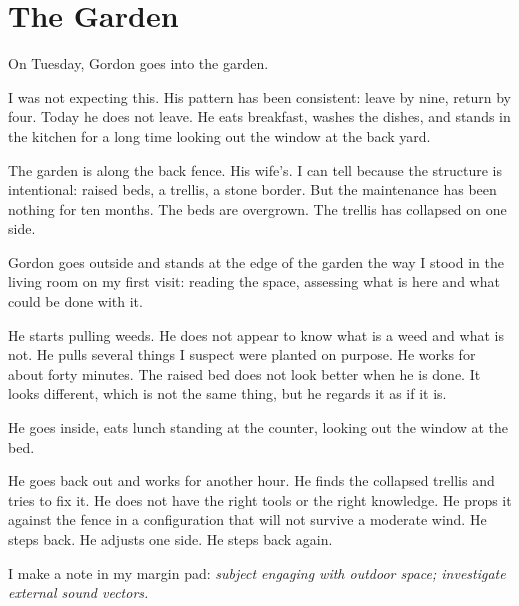 
\chapter{The Garden}

On Tuesday, Gordon goes into the garden.

I was not expecting this. His pattern has been consistent: leave by nine, return by four. Today he does not leave. He eats breakfast, washes the dishes, and stands in the kitchen for a long time looking out the window at the back yard.

The garden is along the back fence. His wife's. I can tell because the structure is intentional: raised beds, a trellis, a stone border. But the maintenance has been nothing for ten months. The beds are overgrown. The trellis has collapsed on one side.

Gordon goes outside and stands at the edge of the garden the way I stood in the living room on my first visit: reading the space, assessing what is here and what could be done with it.

He starts pulling weeds. He does not appear to know what is a weed and what is not. He pulls several things I suspect were planted on purpose. He works for about forty minutes. The raised bed does not look better when he is done. It looks different, which is not the same thing, but he regards it as if it is.

He goes inside, eats lunch standing at the counter, looking out the window at the bed.

He goes back out and works for another hour. He finds the collapsed trellis and tries to fix it. He does not have the right tools or the right knowledge. He props it against the fence in a configuration that will not survive a moderate wind. He steps back. He adjusts one side. He steps back again.

I make a note in my margin pad: \emph{subject engaging with outdoor space; investigate external sound vectors.}
